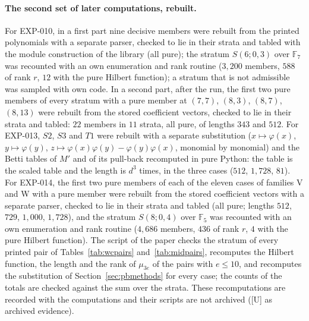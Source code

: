 \documentclass[11pt]{article}
\theoremstyle{definition}
\theoremstyle{remark}
\newcommand{\EXP}[1]{\mbox{EXP-#1}}
\newcommand{\F}{\mathbb{F}}
\begin{document}
\paragraph{The second set of later computations, rebuilt.} For \EXP{010}, in a first part nine decisive members were rebuilt from the printed polynomials with a separate parser, checked to lie in their strata and tabled with the module construction of the library (all pure); the stratum $S(6;0,3)$ over $\F_7$ was recounted with an own enumeration and rank routine ($3{,}200$ members, $588$ of rank $r$, $12$ with the pure Hilbert function); a stratum that is not admissible was sampled with own code. In a second part, after the run, the first two pure members of every stratum with a pure member at $(7,7)$, $(8,3)$, $(8,7)$, $(8,13)$ were rebuilt from the stored coefficient vectors, checked to lie in their strata and tabled: $22$ members in $11$ strata, all pure, of lengths $343$ and $512$. For \EXP{013}, $S2$, $S3$ and $T1$ were rebuilt with a separate substitution ($x\mapsto\varphi(x)$, $y\mapsto\varphi(y)$, $z\mapsto\varphi(x)\varphi(y)-\varphi(y)\varphi(x)$, monomial by monomial) and the Betti tables of $M'$ and of its pull-back recomputed in pure Python: the table is the scaled table and the length is $d^3$ times, in the three cases ($512$, $1{,}728$, $81$). For \EXP{014}, the first two pure members of each of the eleven cases of families V and W with a pure member were rebuilt from the stored coefficient vectors with a separate parser, checked to lie in their strata and tabled (all pure; lengths $512$, $729$, $1{,}000$, $1{,}728$), and the stratum $S(8;0,4)$ over $\F_5$ was recounted with an own enumeration and rank routine ($4{,}686$ members, $436$ of rank $r$, $4$ with the pure Hilbert function). The script of the paper checks the stratum of every printed pair of Tables~\ref{tab:wcpairs} and~\ref{tab:midpairs}, recomputes the Hilbert function, the length and the rank of $\mu_{3e}$ of the pairs with $e\le10$, and recomputes the substitution of Section~\ref{sec:pbmethods} for every case; the counts of the totals are checked against the sum over the strata. These recomputations are recorded with the computations and their scripts are not archived ([U] as archived evidence).
\end{document}
